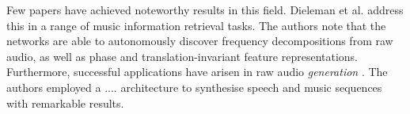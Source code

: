 \documentclass[12pt]{llncs}
\begin{document}
Few papers have achieved noteworthy results in this field. Dieleman et al. \cite{dieleman2014end} address this in a range of music information retrieval tasks. The authors note that the networks are able to autonomously discover frequency decompositions from raw audio, as well as phase and translation-invariant feature representations. Furthermore, successful applications have arisen in raw audio \emph{generation} \cite{van2016wavenet}. The authors employed a .... architecture to synthesise speech and music sequences with remarkable results.




\begin{comment}

\subsubsection*{Steve}
Read through:
\begin{itemize}
	\item Bell: Edges are `Independent Components' of Natural Scenes. Note the emergency of wavelet-like  filters: DC filter, oriented filters and localised checkerboard patterns. Originated from an information theoretic learning rule which has no noise model and is sensitive to higher-order statistics.
	\item Aapo Hyvarinen
	\item Plumbley: `If the Independent Components of Natural Images are Edges, what are the Independent Components of Natural Sounds? Argument for ICA representation resembling layout of the auditory filter-bank in humans, equivalence to Bell's discovery in vision stated.
\end{itemize}
Consider:
\begin{itemize}
	\item Find paper (send to Steve) comparing wavelet to raw audio performance: have benefits been considered for combining information from both models or training on a vector containing both frequency and temporal representations?
	\item As on overall problem we are considering a function to maximise detection utility. An approach may be information theoretic -- wavelet-like structures appear (i.e. ICA) -- or stem from CNNs/RL: spectrogram vs raw data itself.
	\item Maximising information throughput in a system, ICA (commonly? or was?) used for pre-training lower layers in a network architecture
	\item Google paper: search for topic of: what is easy to classify, what isn't. Building a hierarchy successfully: solve easy parts first, rather than trying to solve everything at once and end up solving nothing
	\item When simulating data for training, consider if inverting our `generative' model can yield an optimal detector? Problems may include location invariance/pose/orientation not being captured, leading to issues with generalisation.
\end{itemize}




\end{comment}
\end{document}
